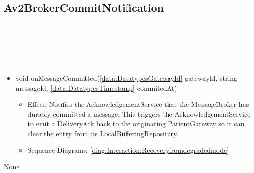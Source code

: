   \subsection{Av2BrokerCommitNotification}\label{int:InterfacesAv2BrokerCommitNotification}
    \begin{description}
      \item[Provided by:] \iconcomponent{}~
      \item[Required by:] \iconcomponent{}~ 
      \item[Operations:] ~
    \begin{itemize}[noitemsep,nolistsep,leftmargin=-.25cm]
      \item \textsf{void onMessageCommitted(\ref{data:DatatypesGatewayId} gatewayId, string messageId, \ref{data:DatatypesTimestamp} commitedAt)}
        \begin{itemize}[noitemsep,nolistsep]
           \item Effect: Notifies the AcknowledgementService that the MessageBroker has durably committed a message. This triggers the AcknowledgementService to emit a DeliveryAck back to the originating PatientGateway so it can clear the entry from its LocalBufferingRepository. 
           \item Sequence Diagrams: \cref{diag:Interaction:Recoveryfromdegradedmode}
        \end{itemize}
    \end{itemize}
      \item[Diagrams:] None
    \end{description}

